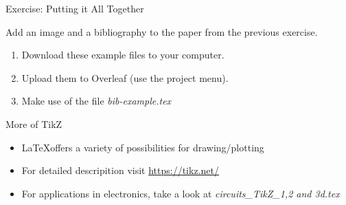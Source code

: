 \documentclass{beamer}
\begin{document}
\begin{frame}[fragile]{Exercise: Putting it All Together}

Add an image and a bibliography to the paper from the previous exercise.

\begin{enumerate}
\item Download these example files to your computer.

\begin{center}

\end{center}

\item Upload them to Overleaf (use the project menu).
\item Make use of the file \emph{bib-example.tex}

\end{enumerate}

\end{frame}
\begin{frame}{More of TikZ}
\begin{itemize}
    \item \LaTeX offers a variety of possibilities for drawing/plotting
    \item For detailed descripition visit \url{https://tikz.net/}
    \item For applications in electronics, take a look at \emph{circuits\_TikZ\_1,2 and 3d.tex}
\end{itemize}

\end{frame}



\end{document}
